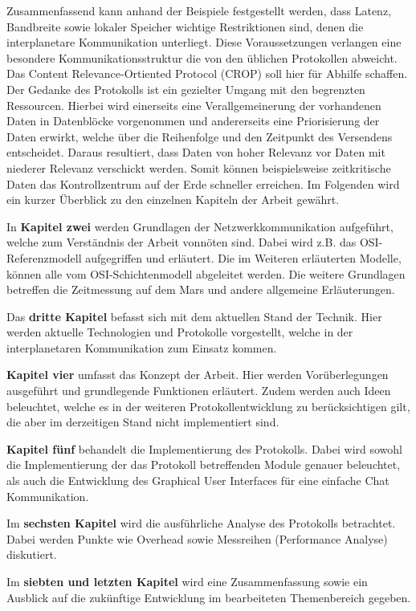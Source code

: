 Zusammenfassend kann anhand der Beispiele festgestellt werden, dass Latenz, 
Bandbreite sowie lokaler Speicher wichtige Restriktionen sind, denen die 
interplanetare Kommunikation unterliegt. Diese Voraussetzungen verlangen 
eine besondere Kommunikationsstruktur die von den {\"u}blichen Protokollen 
abweicht. Das Content Relevance-Ortiented Protocol (CROP) soll hier
f{\"u}r Abhilfe schaffen.
Der Gedanke des Protokolls ist ein gezielter Umgang mit den begrenzten 
Ressourcen. Hierbei wird einerseits eine Verallgemeinerung der vorhandenen 
Daten in Datenbl{\"o}cke vorgenommen und andererseits eine Priorisierung der 
Daten erwirkt, welche {\"u}ber die Reihenfolge und den Zeitpunkt des 
Versendens entscheidet. Daraus resultiert, dass Daten von hoher Relevanz 
vor Daten mit niederer Relevanz verschickt werden. Somit k{\"o}nnen 
beispielsweise zeitkritische Daten das Kontrollzentrum auf der Erde 
schneller erreichen. Im Folgenden wird ein kurzer {\"U}berblick zu den einzelnen
Kapiteln der Arbeit gew{\"a}hrt.

In \textbf{Kapitel zwei} werden Grundlagen der Netzwerkkommunikation
aufgef{\"u}hrt, welche zum Verst{\"a}ndnis der Arbeit vonn{\"o}ten sind. Dabei wird z.B. das
OSI-Referenzmodell aufgegriffen und erl{\"a}utert. Die im Weiteren
erl{\"a}uterten Modelle, k{\"o}nnen alle vom OSI-Schichtenmodell abgeleitet
werden. Die weitere Grundlagen betreffen die Zeitmessung auf dem Mars und
andere allgemeine Erl{\"a}uterungen.

Das \textbf{dritte Kapitel} befasst sich mit dem aktuellen Stand der Technik.
Hier werden aktuelle Technologien und Protokolle vorgestellt, welche in der interplanetaren
Kommunikation zum Einsatz kommen. 

\textbf{Kapitel vier} umfasst das Konzept der Arbeit. Hier werden
Vor{\"u}berlegungen ausgef{\"u}hrt und grundlegende Funktionen erl{\"a}utert. Zudem werden auch
Ideen beleuchtet, welche es in der weiteren Protokollentwicklung zu
ber{\"u}cksichtigen gilt, die aber im derzeitigen Stand nicht implementiert sind.

\textbf{Kapitel f{\"u}nf} behandelt die Implementierung des Protokolls. Dabei
wird sowohl die Implementierung der das Protokoll betreffenden Module genauer beleuchtet,
als auch die Entwicklung des Graphical User Interfaces f{\"u}r eine einfache
Chat Kommunikation.

Im \textbf{sechsten Kapitel} wird die ausf{\"u}hrliche Analyse des Protokolls
betrachtet.
Dabei werden Punkte wie Overhead sowie Messreihen (Performance Analyse)
diskutiert.

Im \textbf{siebten und letzten Kapitel} wird eine Zusammenfassung sowie ein
Ausblick auf die zuk{\"u}nftige Entwicklung im bearbeiteten Themenbereich gegeben.

